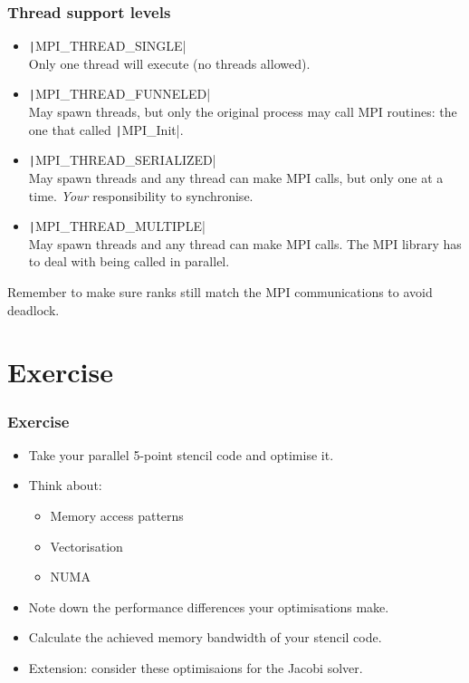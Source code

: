 \documentclass[aspectratio=169]{beamer}
\begin{document}
\begin{frame}
  \frametitle{Thread support levels}
  \begin{itemize}
    \item \texttt|MPI_THREAD_SINGLE| \\
    Only one thread will execute (no threads allowed).
  
    \item \texttt|MPI_THREAD_FUNNELED| \\
    May spawn threads, but only the original process may call MPI routines: the one that called \texttt|MPI_Init|.
  
    \item \texttt|MPI_THREAD_SERIALIZED| \\
    May spawn threads and any thread can make MPI calls, but only one at a time. \emph{Your} responsibility to synchronise.
  
    \item \texttt|MPI_THREAD_MULTIPLE| \\
    May spawn threads and any thread can make MPI calls. The MPI library has to deal with being called in parallel.
  \end{itemize}
  
  Remember to make sure ranks still match the MPI communications to avoid deadlock.
  
  \end{frame}

\section{Exercise}
\begin{frame}
\frametitle{Exercise}
\begin{itemize}
  \item Take your parallel 5-point stencil code and optimise it.
  \item Think about:
    \begin{itemize}
      \item Memory access patterns
      \item Vectorisation
      \item NUMA
    \end{itemize}
  \item Note down the performance differences your optimisations make.
  \item Calculate the achieved memory bandwidth of your stencil code.
  \item Extension: consider these optimisaions for the Jacobi solver.
\end{itemize}
\end{frame}
\end{document}
